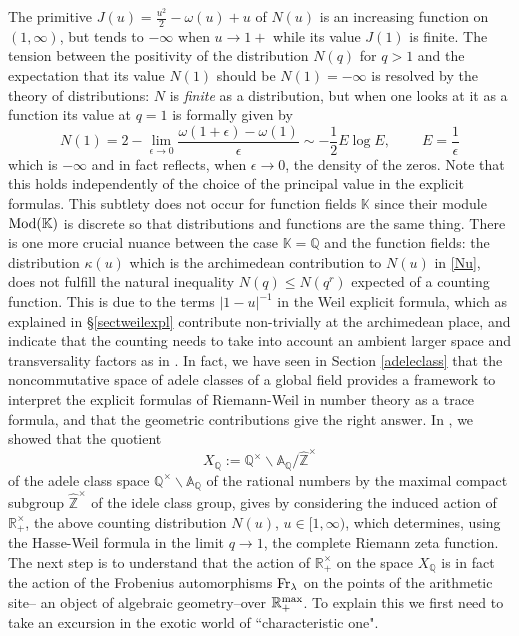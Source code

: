 \documentclass[12pt]{article}
\def\mmod{{\rm Mod}}
\def\A{{\mathbb A}}
\def\K{{\mathbb K}}
\def\Q{{\mathbb Q}}
\def\R{{\mathbb R}}
\def\Z{{\mathbb Z}}
\def\hatz{{\hat\Z^\times}}
\def\rmax{\R_+^{\rm max}}
\def\fr{{\rm Fr}}
\begin{document}
The primitive $J(u)=\frac{u^2}{2}-\omega(u)+u$ of $N(u)$ is an increasing function on $(1,\infty)$, but tends to $-\infty$ when $u\to 1+$ while its value $J(1)$ is finite. The tension between the positivity of the distribution $N(q)$ for $q>1$ and the expectation that its  value $N(1)$ should be $N(1)=-\infty$ is resolved by the theory of distributions: $N$ is {\em finite} as a distribution, but when one looks at it as a function its value at $q=1$ is formally given by
$$
N(1)=2-\lim_{\epsilon\to 0}\frac{\omega(1+\epsilon)-\omega(1)}{\epsilon}\sim-\frac 12 E \log E,\qquad \ E=\frac 1\epsilon
$$
which is $-\infty$ and in fact reflects, when $\epsilon\to 0$,  the density of the zeros. Note that this holds independently of the choice of the principal value in the explicit formulas.  This subtlety does not occur for function fields $\K$ since their module $\mmod(\K)$ is discrete so that distributions and functions are the same thing. There is one more crucial nuance between the case $\K=\Q$ and the function fields: the distribution $\kappa(u)$ which is the archimedean contribution to $N(u)$ in \eqref{Nu}, does not fulfill the natural inequality $N(q)\leq N(q^r)$ expected of a counting function. This is due to the  terms $\vert 1-u\vert^{-1}$ in the Weil explicit formula, which as explained in \S \ref{sectweilexpl} contribute non-trivially at the archimedean place, and indicate that the counting needs to take into account an ambient larger space and transversality factors as in \cite{gui}.
In fact, we have seen in Section \ref{adeleclass} that the noncommutative space of adele classes of a global field provides a framework to interpret the explicit formulas of Riemann-Weil in number theory as a trace formula, and that the geometric contributions give the right answer. In \cite{CC1}, we showed that the quotient
\begin{equation}\label{doublequot}
X_\Q:=\Q^\times\backslash \A_\Q/\hatz
\end{equation}
of the adele class space $\Q^\times\backslash \A_\Q$ of the rational numbers by the maximal compact subgroup $\hatz$ of the idele class group,  gives by considering the induced action of $\R_+^\times$, the above counting distribution $N(u)$, $u\in [1,\infty)$, which determines, using the Hasse-Weil formula in the limit $q\to 1$, the complete Riemann zeta function. The next step is to understand that  the action of $\R_+^\times$ on the space $X_\Q$ is in fact the action of the Frobenius automorphisms $\fr_\lambda$ on the points of the arithmetic site-- an object of algebraic geometry--over $\rmax$. To explain this we first need to take an excursion in the exotic world of ``characteristic one".
\end{document}
